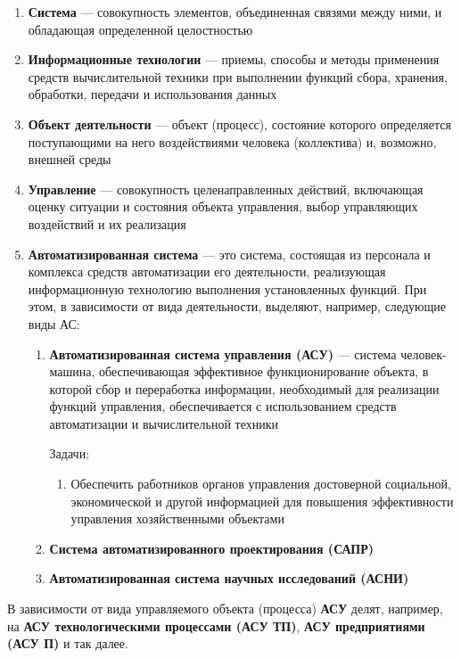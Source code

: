 \documentclass{article}
\begin{document}
\begin{enumerate}
	\item \textbf{Система} — совокупность элементов, объединенная связями между ними, и обладающая определенной целостностью
	\item \textbf{Информационные технологии} — приемы, способы и методы применения средств вычислительной техники при выполнении функций сбора, хранения, обработки, передачи и использования данных
	\item \textbf{Объект деятельности} — объект (процесс), состояние которого определяется поступающими на него воздействиями человека (коллектива) и, возможно, внешней среды
	\item \textbf{Управление} — совокупность целенаправленных действий, включающая оценку ситуации и состояния объекта управления, выбор управляющих воздействий и их реализация
	\item \textbf{Автоматизированная система} — это система, состоящая из персонала и комплекса средств автоматизации его деятельности, реализующая информационную технологию выполнения установленных функций. При этом, в зависимости от вида деятельности, выделяют, например, следующие виды АС:
	\begin{enumerate}
		\item \textbf{Автоматизированная система управления (АСУ)} — система человек-машина, обеспечивающая эффективное функционирование объекта, в которой сбор и переработка информации, необходимый для реализации функций управления, обеспечивается с использованием средств автоматизации и вычислительной техники

		Задачи:
		\begin{enumerate}
			\item Обеспечить работников органов управления достоверной социальной, экономической и другой информацией для повышения эффективности управления хозяйственными объектами
		\end{enumerate}
		\item \textbf{Система автоматизированного проектирования (САПР)}
		\item \textbf{Автоматизированная система научных исследований (АСНИ)}
	\end{enumerate}
\end{enumerate}

В зависимости от вида управляемого объекта (процесса) \textbf{АСУ} делят, например, на \textbf{АСУ технологическими процессами (АСУ ТП)}, \textbf{АСУ предприятиями (АСУ П)} и так далее. \\[1 mm]
\end{document}
